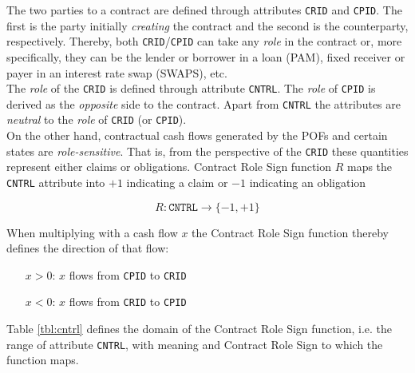 \documentclass[9pt,oneside]{amsart}
\newcommand{\attr}[1]{\texttt{#1}}
\begin{document}
\begin{multicols}{2}
The two parties to a contract are defined through attributes \attr{CRID} and \attr{CPID}. The first is the party initially \textit{creating} the contract and the second is the counterparty, respectively. Thereby, both \attr{CRID}/\attr{CPID} can take any \textit{role} in the contract or, more specifically, they can be the lender or borrower in a loan (PAM), fixed receiver or payer in an interest rate swap (SWAPS), etc.\\

The \textit{role} of the \attr{CRID} is defined through attribute \attr{CNTRL}. The \textit{role} of \attr{CPID} is derived as the \textit{opposite} side to the contract. Apart from \attr{CNTRL} the attributes are \textit{neutral} to the \textit{role} of \attr{CRID} (or \attr{CPID}).\\

On the other hand, contractual cash flows generated by the POFs and certain states are \textit{role-sensitive}. That is, from the perspective of the \attr{CRID} these quantities represent either claims or obligations. Contract Role Sign function $R$ maps the \attr{CNTRL} attribute into $+1$ indicating a claim or $-1$ indicating an obligation

\[
	R : \attr{CNTRL} \rightarrow \{-1, +1 \}
\]

When multiplying with a cash flow $x$ the Contract Role Sign function thereby defines the direction of that flow:

\begin{itemize}
	\item[$x>0$:] $x$ flows from \attr{CPID} to \attr{CRID}

	\item[$x<0$:] $x$ flows from \attr{CRID} to \attr{CPID}
\end{itemize}

Table \ref{tbl:cntrl} defines the domain of the Contract Role Sign function, i.e. the range of attribute \attr{CNTRL}, with meaning and Contract Role Sign to which the function maps.



\end{multicols}
\end{document}
